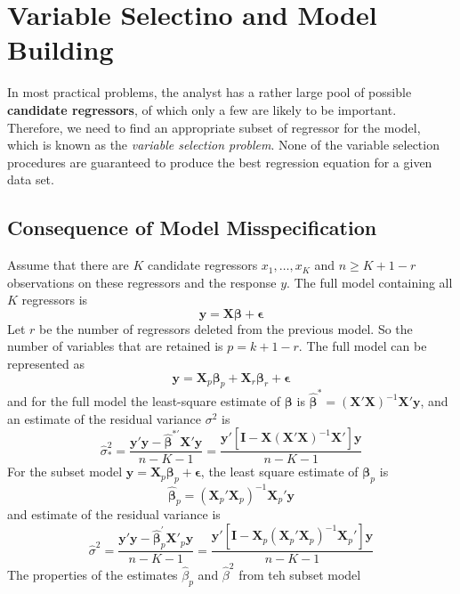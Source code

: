 \documentclass[11pt]{article}
\theoremstyle{definition}
\begin{document}
\section{Variable Selectino and Model Building}
In most practical problems, the analyst has a rather large pool of possible \textbf{candidate regressors}, of which only a few are likely to be important. Therefore, we need to find an appropriate subset of regressor for the model, which is known as the \textit{variable selection problem}. None of the variable selection procedures are guaranteed to produce the best regression equation for a given data set.
\subsection{Consequence of Model Misspecification}
Assume that there are $K$ candidate regressors $x_1,\ldots, x_K$ and $n\geq K+1-r$ observations on these regressors and the response $y$. The full model containing all $K$ regressors is
\[
\bm{y}=\bm{X\beta}+\bm{\epsilon}
\]
Let $r$ be the number of regressors deleted from the previous model. So the number of variables that are retained is $p=k+1-r$. The full model can be represented as
\[
\bm{y}=\bm{X}_p\bm{\beta}_p+\bm{X}_r\bm{\beta}_r+\bm{\epsilon}
\]
and for the full model the least-square estimate of $\bm{\beta}$ is $\hat{\bm{\beta}}^\ast = (\bm{X}'\bm{X})^{-1}\bm{X}'\bm{y}$, and an estimate of the residual variance $\sigma^2$ is
\[
\hat{\sigma}^2_\ast=\frac{\bm{y}'\bm{y}-\hat{\bm{\beta}}^{\ast\prime}\bm{X}'\bm{y}}{n-K-1}=\frac{\bm{y}'[\bm{I}-\bm{X}(\bm{X}'\bm{X})^{-1}\bm{X}']\bm{y}}{n-K-1}
\]
For the subset model $\bm{y}=\bm{X}_p\bm{\beta}_p+\bm{\epsilon}$, the least square estimate of $\bm{\beta}_p$ is 
\[
\hat{\bm{\beta}}_p=(\bm{X}_p'\bm{X}_p)^{-1}\bm{X}_p'\bm{y}
\]
and estimate of the residual variance is
\[
\hat{\sigma}^2=\frac{\bm{y}'\bm{y}-\hat{\bm{\beta}}^{\prime}_p\bm{X}'_p\bm{y}}{n-K-1}=\frac{\bm{y}'[\bm{I}-\bm{X}_p(\bm{X}_p'\bm{X}_p)^{-1}\bm{X}_p']\bm{y}}{n-K-1}
\]
The properties of the estimates $\hat{\beta}_p$ and $\hat{\beta}^2$ from teh subset model
\end{document}

